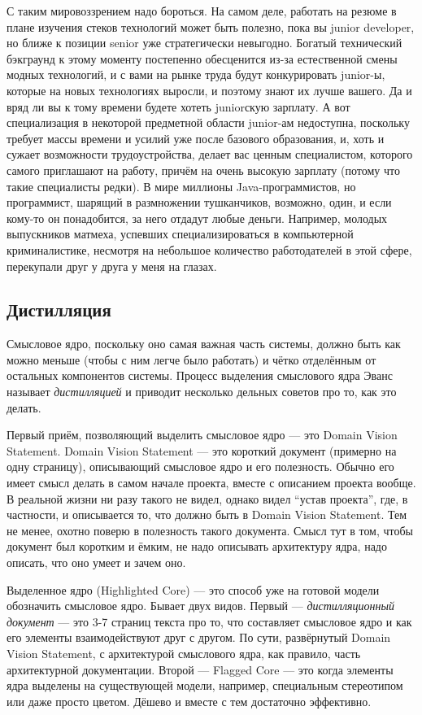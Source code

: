 \documentclass{../../text-style}
\begin{document}
С таким мировоззрением надо бороться. На самом деле, работать на резюме в плане изучения стеков технологий может быть полезно, пока вы junior developer, но ближе к позиции senior уже стратегически невыгодно. Богатый технический бэкграунд к этому моменту постепенно обесценится из-за естественной смены модных технологий, и с вами на рынке труда будут конкурировать junior-ы, которые на новых технологиях выросли, и поэтому знают их лучше вашего. Да и вряд ли вы к тому времени будете хотеть juniorскую зарплату. А вот специализация в некоторой предметной области junior-ам недоступна, поскольку требует массы времени и усилий уже после базового образования, и, хоть и сужает возможности трудоустройства, делает вас ценным специалистом, которого самого приглашают на работу, причём на очень высокую зарплату (потому что такие специалисты редки). В мире миллионы Java-программистов, но программист, шарящий в размножении тушканчиков, возможно, один, и если кому-то он понадобится, за него отдадут любые деньги. Например, молодых выпускников матмеха, успевших специализироваться в компьютерной криминалистике, несмотря на небольшое количество работодателей в этой сфере, перекупали друг у друга у меня на глазах.

\subsection{Дистилляция}

Смысловое ядро, поскольку оно самая важная часть системы, должно быть как можно меньше (чтобы с ним легче было работать) и чётко отделённым от остальных компонентов системы. Процесс выделения смыслового ядра Эванс называет \textit{дистилляцией} и приводит несколько дельных советов про то, как это делать.

Первый приём, позволяющий выделить смысловое ядро --- это Domain Vision Statement. Domain Vision Statement --- это короткий документ (примерно на одну страницу), описывающий смысловое ядро и его полезность. Обычно его имеет смысл делать в самом начале проекта, вместе с описанием проекта вообще. В реальной жизни ни разу такого не видел, однако видел ``устав проекта'', где, в частности, и описывается то, что должно быть в Domain Vision Statement. Тем не менее, охотно поверю в полезность такого документа. Смысл тут в том, чтобы документ был коротким и ёмким, не надо описывать архитектуру ядра, надо описать, что оно умеет и зачем оно.

Выделенное ядро (Highlighted Core) --- это способ уже на готовой модели обозначить смысловое ядро. Бывает двух видов. Первый --- \textit{дистилляционный документ} --- это 3-7 страниц текста про то, что составляет смысловое ядро и как его элементы взаимодействуют друг с другом. По сути, развёрнутый Domain Vision Statement, с архитектурой смыслового ядра, как правило, часть архитектурной документации. Второй --- Flagged Core --- это когда элементы ядра выделены на существующей модели, например, специальным стереотипом или даже просто цветом. Дёшево и вместе с тем достаточно эффективно.
\end{document}
